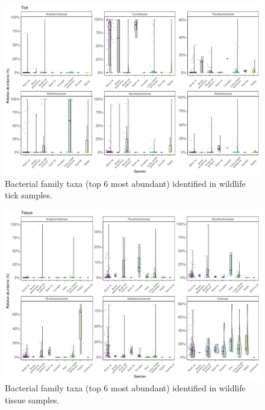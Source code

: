 \documentclass[a4paper, nobind]{templates/ociamthesis}
\begin{document}
\begin{figure}
\includegraphics[width=0.8\linewidth]{figures/ms-figs-appendix/FigA-3.7} \caption[Bacterial family taxa identified in wildlife tick samples.]{Bacterial family taxa (top 6 most abundant) identified in wildlife tick samples.}\label{fig:FA37}
\end{figure}

\newpage

\begin{figure}
\includegraphics[width=0.8\linewidth]{figures/ms-figs-appendix/FigA-3.8} \caption[Bacterial family taxa identified in wildlife tissue samples.]{Bacterial family taxa (top 6 most abundant) identified in wildlife tissue samples.}\label{fig:FA38}
\end{figure}

\newpage
\end{document}
